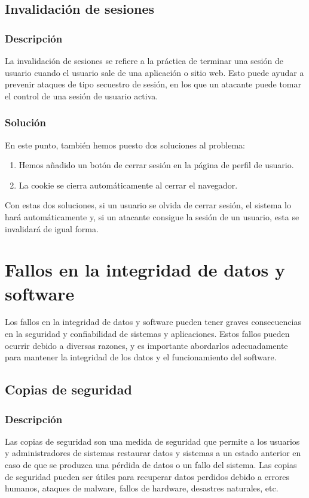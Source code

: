 \documentclass{report}
\begin{document}
            \subsection{Invalidación de sesiones}
                    \subsubsection{Descripción}
                        La invalidación de sesiones se refiere a la práctica de terminar una sesión de usuario cuando el usuario sale de una aplicación o sitio web. Esto puede ayudar a prevenir ataques de tipo secuestro de sesión, en los que un atacante puede tomar el control de una sesión de usuario activa.
                    \subsubsection{Solución}
                        En este punto, también hemos puesto dos soluciones al problema:
                        \begin{enumerate}
                            \item Hemos añadido un botón de cerrar sesión en la página de perfil de usuario.
                            \item La cookie se cierra automáticamente al cerrar el navegador.
                        \end{enumerate}
                        Con estas dos soluciones, si un usuario se olvida de cerrar sesión, el sistema lo hará automáticamente y, si un atacante consigue la sesión de un usuario, esta se invalidará de igual forma.
            \clearpage
        \section{Fallos en la integridad de datos y software}
            Los fallos en la integridad de datos y software pueden tener graves consecuencias en la seguridad y confiabilidad de sistemas y aplicaciones. Estos fallos pueden ocurrir debido a diversas razones, y es importante abordarlos adecuadamente para mantener la integridad de los datos y el funcionamiento del software.
            \subsection{Copias de seguridad}
                \subsubsection{Descripción}
                    Las copias de seguridad son una medida de seguridad que permite a los usuarios y administradores de sistemas restaurar datos y sistemas a un estado anterior en caso de que se produzca una pérdida de datos o un fallo del sistema. Las copias de seguridad pueden ser útiles para recuperar datos perdidos debido a errores humanos, ataques de malware, fallos de hardware, desastres naturales, etc.
\end{document}

